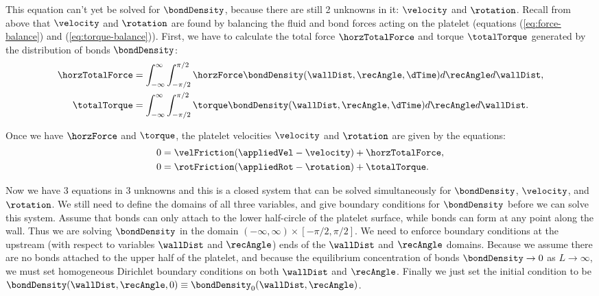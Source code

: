 This equation can't yet be solved for $\bondDensity$, because there
are still 2 unknowns in it: $\velocity$ and $\rotation$. Recall from
above that $\velocity$ and $\rotation$ are found by balancing the
fluid and bond forces acting on the platelet (equations
(\ref{eq:force-balance}) and (\ref{eq:torque-balance})). First, we
have to calculate the total force $\horzTotalForce$ and torque
$\totalTorque$ generated by the distribution of bonds $\bondDensity$:
\begin{align}
  \label{eq:horz-total-force}
  \horzTotalForce &= \int_{-\infty}^{\infty} \int_{-\pi/2}^{\pi/2}
                    \horzForce \bondDensity(\wallDist, \recAngle, \dTime)
                    d\recAngle d\wallDist, \\ 
  \label{eq:total-torque}
  \totalTorque &= \int_{-\infty}^{\infty} \int_{-\pi/2}^{\pi/2}
                 \torque \bondDensity(\wallDist, \recAngle, \dTime)
                 d\recAngle d\wallDist.
\end{align}

Once we have $\horzForce$ and $\torque$, the platelet velocities
$\velocity$ and $\rotation$ are given by the equations:
\begin{align}
  \label{eq:force-balance}
  0 &= \velFriction (\appliedVel - \velocity) + \horzTotalForce, \\
  \label{eq:torque-balance}
  0 &= \rotFriction (\appliedRot - \rotation) + \totalTorque.
\end{align}

Now we have 3 equations in 3 unknowns and this is a closed system that
can be solved simultaneously for $\bondDensity$, $\velocity$, and
$\rotation$. We still need to define the domains of all three
variables, and give boundary conditions for $\bondDensity$ before we
can solve this system. Assume that bonds can only attach to the lower
half-circle of the platelet surface, while bonds can form at any point
along the wall. Thus we are solving $\bondDensity$ in the domain
$(-\infty, \infty) \times [-\pi/2, \pi/2]$. We need to enforce
boundary conditions at the upstream (with respect to variables
$\wallDist$ and $\recAngle$) ends of the $\wallDist$ and $\recAngle$
domains. Because we assume there are no bonds attached to the upper
half of the platelet, and because the equilibrium concentration of
bonds $\bondDensity \rightarrow 0$ as $L \rightarrow \infty$, we must
set homogeneous Dirichlet boundary conditions on both $\wallDist$ and
$\recAngle$. Finally we just set the initial condition to be
$\bondDensity(\wallDist, \recAngle, 0) \equiv \bondDensity_0(\wallDist,
\recAngle)$.

